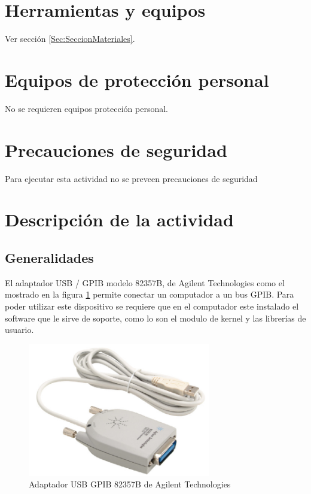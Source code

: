 \documentclass[paper=letter,oneside,fontsize=11pt]{article}
\begin{document}
	\section{Herramientas y equipos}
		
		Ver sección \ref{Sec:SeccionMateriales}.

	
	\section{Equipos de protección personal}
	
		No se requieren equipos protección personal.
		
	\section{Precauciones de seguridad}
	
		Para ejecutar esta actividad no se preveen precauciones de seguridad
		
	\section{Descripción de la actividad}
	
		\subsection{Generalidades}
	
		El adaptador USB / GPIB modelo 82357B, de Agilent Technologies como el mostrado en la figura \ref{Fig:AdaptadorGpibUsb} permite conectar un computador a un bus GPIB. Para poder utilizar este dispositivo se requiere que en el computador este instalado el software que le sirve de soporte, como lo son el modulo de kernel y las librerías de usuario.	
		
		\begin{figure}[!h]
			\begin{center}
				\includegraphics[width=8cm]{Imagenes/AdaptadorGpibUsb.pdf}
				\caption{Adaptador USB GPIB 82357B de Agilent Technologies}
				\label{Fig:AdaptadorGpibUsb}
			\end{center}
		\end{figure}	
		
\end{document}
